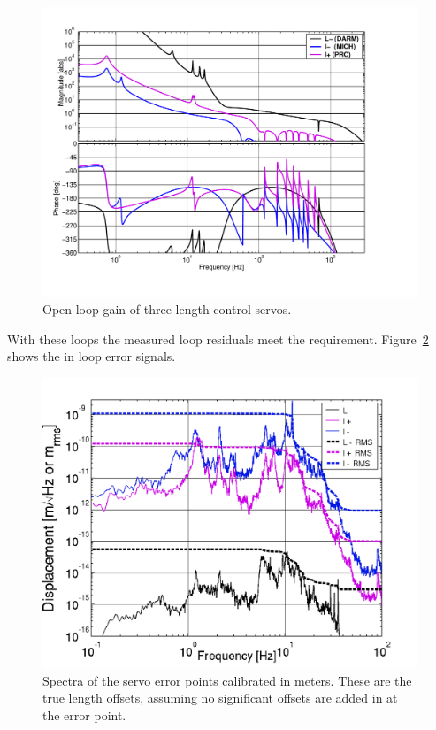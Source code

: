 \begin{figure}[!h] 
\centerline{\includegraphics[angle=0,width=6.5in]{Figures/Chap5/LSC-Loops.pdf}}
\caption[Length Loops]{Open loop gain of three length control servos.}
\label{fig:Loops}
\end{figure}
With these loops the measured loop residuals meet the requirement. 
Figure~\ref{fig:residuals} shows the in loop error signals.

\begin{figure}[!h] 
\centerline{\includegraphics[angle=0,width=6.5in]{Figures/Chap5/residuals.png}}
\caption[Residual Fringe Offsets]{Spectra of the servo error points calibrated
         in meters. These are the true length offsets, assuming no significant
         offsets are added in at the error point.}
\label{fig:residuals}
\end{figure}


